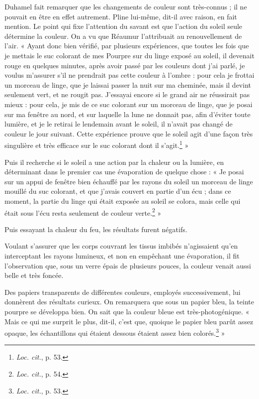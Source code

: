 \documentclass[a4paper, 11pt, oneside, polutonikogreek, french]{article}
\begin{document}
Duhamel fait remarquer que les changements de couleur sont très-connus ; il ne pouvait en être en effet autrement. Pline lui-même, dit-il avec raison, en fait mention. Le point qui fixe l'attention du savant est que l'action du soleil seule détermine la couleur. On a vu que Réaumur l'attribuait au renouvellement de l'air. « Ayant donc bien vérifié, par plusieurs expériences, que toutes les fois que je mettais le suc colorant de mes Pourpre sur du linge exposé au soleil, il devenait rouge en quelques minutes, après avoir passé par les couleurs dont j'ai parlé, je voulus m'assurer s'il ne prendrait pas cette couleur à l'ombre : pour cela je frottai un morceau de linge, que je laissai passer la nuit sur ma cheminée, mais il devint seulement vert, et ne rougit pas. J'essayai encore si le grand air ne réussirait pas mieux : pour cela, je mis de ce suc colorant sur un morceau de linge, que je posai sur ma fenêtre au nord, et sur laquelle la lune ne donnait pas, afin d'éviter toute lumière, et je le retirai le lendemain avant le soleil, il n'avait pas changé de couleur le jour suivant. Cette expérience prouve que le soleil agit d'une façon très singulière et très efficace sur le suc colorant dont il s'agit.\footnote{\emph{Loc. cit.}, p. 53.} »

Puis il recherche si le soleil a une action par la chaleur ou la lumière, en déterminant dans le premier cas une évaporation de quelque chose : « Je posai sur un appui de fenêtre bien échauffé par les rayons du soleil un morceau de linge mouillé du suc colorant, et que j'avais couvert en partie d'un écu ; dans ce moment, la partie du linge qui était exposée au soleil se colora, mais celle qui était sous l'écu resta seulement de couleur verte.\footnote{\emph{Loc. cit.}, p. 54.} »

Puis essayant la chaleur du feu, les résultats furent négatifs.

Voulant s'assurer que les corps couvrant les tissus imbibés n'agissaient qu'en interceptant les rayons lumineux, et non en empêchant une évaporation, il fit l'observation que, sous un verre épais de plusieurs pouces, la couleur venait aussi belle et très foncée.

Des papiers transparents de différentes couleurs, employés successivement, lui donnèrent des résultats curieux. On remarquera que sous un papier bleu, la teinte pourpre se développa bien. On sait que la couleur bleue est très-photogénique. « Mais ce qui me surprit le plus, dit-il, c'est que, quoique le papier bleu parût assez opaque, les échantillons qui étaient dessous étaient assez bien colorés.\footnote{\emph{Loc. cit.}, p. 53.} »
\end{document}
